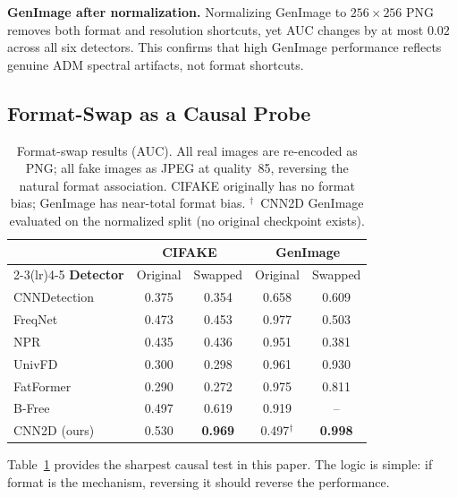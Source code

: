 \noindent\textbf{GenImage after normalization.}
Normalizing GenImage to $256\times256$ PNG removes both format and resolution shortcuts, yet AUC changes by at most $0.02$ across all six detectors.
This confirms that high GenImage performance reflects genuine ADM spectral artifacts, not format shortcuts.


\subsection{Format-Swap as a Causal Probe}
\label{sec:swap_results}

\begin{table}[t]
\centering
\small
\setlength{\tabcolsep}{4pt}
\begin{tabular}{lcccc}
\toprule
 & \multicolumn{2}{c}{\textbf{CIFAKE}} & \multicolumn{2}{c}{\textbf{GenImage}} \\
\cmidrule(lr){2-3}\cmidrule(lr){4-5}
\textbf{Detector} & Original & Swapped & Original & Swapped \\
\midrule
CNNDetection~\cite{wang2020cnn} & 0.375 & 0.354 & 0.658 & 0.609 \\
FreqNet~\cite{freqnet}          & 0.473 & 0.453 & 0.977 & 0.503 \\
NPR~\cite{npr}                  & 0.435 & 0.436 & 0.951 & 0.381 \\
UnivFD~\cite{univfd}            & 0.300 & 0.298 & 0.961 & 0.930 \\
FatFormer~\cite{fatformer}      & 0.290 & 0.272 & 0.975 & 0.811 \\
B-Free~\cite{bfree}             & 0.497 & 0.619 & 0.919 & --    \\
CNN2D (ours)                    & 0.530 & \textbf{0.969} & 0.497$^\dag$ & \textbf{0.998} \\
\bottomrule
\end{tabular}
\caption{Format-swap results (AUC). All real images are re-encoded as PNG; all fake images as JPEG at quality~85, reversing the natural format association. CIFAKE originally has no format bias; GenImage has near-total format bias. $^\dag$~CNN2D GenImage evaluated on the normalized split (no original checkpoint exists).}
\label{tab:swap}
\end{table}

Table~\ref{tab:swap} provides the sharpest causal test in this paper.
The logic is simple: if format is the mechanism, reversing it should reverse the performance.


